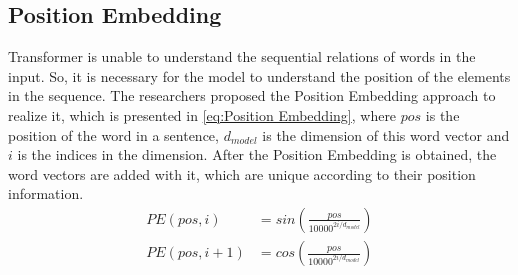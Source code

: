 \subsection{Position Embedding}
  Transformer is unable to understand the sequential relations of  words in the input. So, it is necessary for the model to understand the position of the elements in the sequence.
  The researchers proposed the Position Embedding approach to realize it, which is presented in \autoref{eq:Position Embedding}, where $pos$ is the position of the word in a sentence,
  $d_{model}$ is the dimension of this word vector and $i$ is the indices in the dimension.  After the Position Embedding is obtained, the word vectors are added with it, which are unique
  according to their position information.
  \begin{equation}
    \begin{aligned}
      PE(pos,i) &= sin(\frac{pos}{10000^{2i/d_{model}}})\\
      PE(pos,i+1) &= cos(\frac{pos}{10000^{2i/d_{model}}})
        \label{eq:Position Embedding}
    \end{aligned}
  \end{equation}
